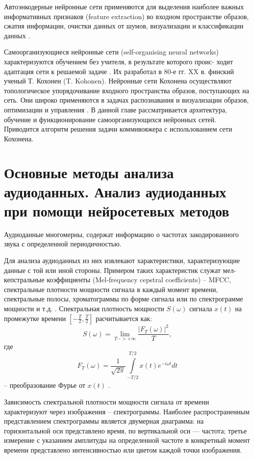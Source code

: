 Автоэнкодерные нейронные сети применяются для выделения наиболее важных информативных признаков 
(feature extraction) во входном пространстве образов, сжатия информации, очистки
данных от шумов, визуализации и классификации данных \cite{bgu_krasn}.

Самоорганизующиеся нейронные сети (self-organising neural networks)
характеризуются обучением без учителя, в результате которого проис-
ходит адаптация сети к решаемой задаче . Их разработал в 80-е гг. XX в.
финский ученый Т. Кохонен (T. Kohonen). Нейронные сети
Кохонена осуществляют топологическое упорядочивание входного
пространства образов, поступающих на сеть. Они широко применяются
в задачах распознавания и визуализации образов, оптимизации и
управления . В данной главе рассматривается архитектура, обучение и
функционирование самоорганизующихся нейронных сетей. Приводится алгоритм решения задачи коммивояжера с использованием сети Кохонена.

\chapter{Основные методы анализа аудиоданных. Анализ аудиоданных при помощи нейросетевых методов}
Аудиоданные многомерны, содержат информацию о частотах закодированного звука с 
определенной периодичностью. 

Для анализа аудиоданных из них извлекают характеристики, характеризующие данные с той или иной стороны.
Примером таких характеристик служат мел-кепстральные коэффициенты (Mel-frequency cepstral coefficients) -- MFCC,
спектральные плотности мощности сигнала в каждый момент времени, 
спектральные полосы, хроматограммы по форме сигнала или по спектрограмме мощности и т.д. \cite{mus_zhao}.
Спектральная плотность мощности $S(\omega)$ сигнала $x(t)$ на промежутке времени $\left[-\frac{T}{2},\frac{T}{2}\right]$ расчитывается как:
\begin{equation}
	S(\omega) = \lim_{T->+\infty} \frac{\left|F_T(\omega)\right|^2}{T},
\end{equation}
где
\begin{equation}
	F_{T}(\omega )={\frac {1}{\sqrt {2\pi }}}\int \limits _{-T/2}^{T/2}x(t)e^{-i\omega t} dt
\end{equation}
-- преобразование Фурье	от $x(t)$ \cite{otnes}.

Зависимость спектральной плотности мощности сигнала от времени характеризуют через изображения -- спектрограммы.
Наиболее распространенным представлением спектрограммы является двумерная диаграмма: на горизонтальной оси представлено время, 
по вертикальной оси — частота; третье измерение с указанием амплитуды на определенной частоте в конкретный момент времени представлено 
интенсивностью или цветом каждой точки изображения.

